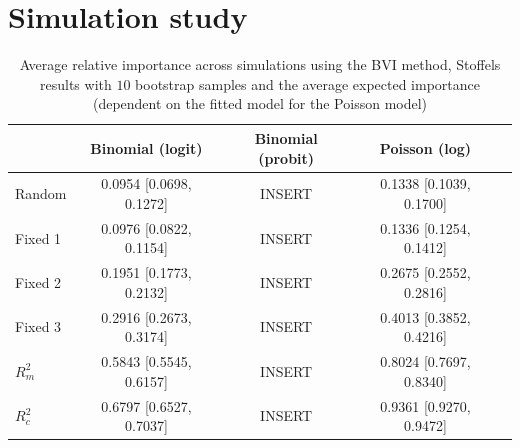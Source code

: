 


\section{Simulation study}

\begin{table}[ht]
  \centering
  \begin{tabular}{lcccc}
  \hline
   & Binomial (logit) & Binomial (probit) & Poisson (log) \\ \hline
  Random & 0.0954 [0.0698, 0.1272] & INSERT & 0.1338 [0.1039, 0.1700] \\
  Fixed 1 & 0.0976 [0.0822, 0.1154] & INSERT & 0.1336 [0.1254, 0.1412] \\
  Fixed 2 & 0.1951 [0.1773, 0.2132] & INSERT & 0.2675 [0.2552, 0.2816] \\
  Fixed 3 & 0.2916 [0.2673, 0.3174] & INSERT & 0.4013 [0.3852, 0.4216] \\ 
  $R^2_m$ & 0.5843 [0.5545, 0.6157] & INSERT & 0.8024 [0.7697, 0.8340] \\ 
  $R^2_c$ & 0.6797 [0.6527, 0.7037] & INSERT & 0.9361 [0.9270, 0.9472] \\ \hline
  \end{tabular}
  \caption{Average relative importance across simulations using the BVI method, Stoffels results with $10$ bootstrap samples and the average expected importance (dependent on the fitted model for the Poisson model)}
  \label{tab:summary_findings}
\end{table}






